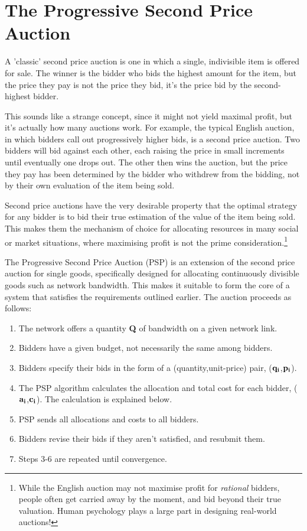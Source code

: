 \section{The Progressive Second Price Auction}

A 'classic' second price auction is one in which a single, indivisible item is offered for sale. The winner is the bidder who bids the highest amount for the item, but the price they pay is not the price they bid, it's the price bid by the second-highest bidder.

This sounds like a strange concept, since it might not yield maximal profit, but it's actually how many auctions work. For example, the typical English auction, in which bidders call out progressively higher bids, is a second price auction. Two bidders will bid against each other, each raising the price in small increments until eventually one drops out. The other then wins the auction, but the price they pay has been determined by the bidder who withdrew from the bidding, not by their own evaluation of the item being sold.

Second price auctions have the very desirable property that the optimal strategy for any bidder is to bid their true estimation of the value of the item being sold. This makes them the mechanism of choice for allocating resources in many social or market situations, where maximising profit is not the prime consideration.\footnote{While the English auction may not maximise profit for {\it rational} bidders, people often get carried away by the moment, and bid beyond their true valuation. Human psychology plays a large part in designing real-world auctions!}

The Progressive Second Price Auction (PSP)\cite{PSP} is an extension of the second price auction for single goods, specifically designed for allocating continuously divisible goods such as network bandwidth. This makes it suitable to form the core of a system that satisfies the requirements outlined earlier. The auction proceeds as follows:

\begin{enumerate}
\item[1)] The network offers a quantity {\bf Q} of bandwidth on a given network link.
\item[2)] Bidders have a given budget, not necessarily the same among bidders.
\item[3)] Bidders specify their bids in the form of a (quantity,unit-price) pair, (${\bf q_i}$,${\bf p_i}$).
\item[4)] The PSP algorithm calculates the allocation and total cost for each bidder, (${\bf a_i}$,${\bf c_i}$). The calculation is explained below.
\item[5)] PSP sends all allocations and costs to all bidders.
\item[6)] Bidders revise their bids if they aren't satisfied, and resubmit them.
\item[7)] Steps 3-6 are repeated until convergence.
\end{enumerate}

